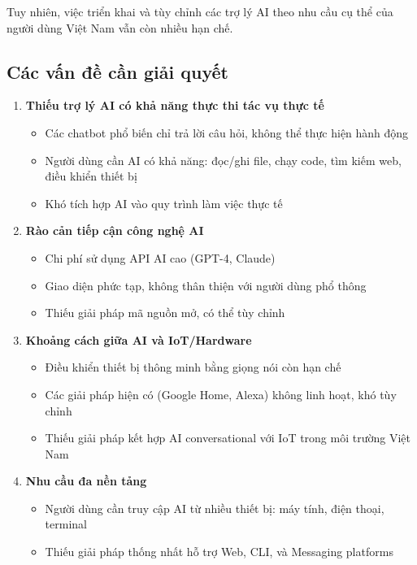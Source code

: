 \documentclass[12pt,a4paper]{article}
\begin{document}
Tuy nhiên, việc triển khai và tùy chỉnh các trợ lý AI theo nhu cầu cụ thể của người dùng Việt Nam vẫn còn nhiều hạn chế.

\subsection{Các vấn đề cần giải quyết}

\begin{enumerate}[label=\textbf{(\arabic*)}]
    \item \textbf{Thiếu trợ lý AI có khả năng thực thi tác vụ thực tế}
    \begin{itemize}
        \item Các chatbot phổ biến chỉ trả lời câu hỏi, không thể thực hiện hành động
        \item Người dùng cần AI có khả năng: đọc/ghi file, chạy code, tìm kiếm web, điều khiển thiết bị
        \item Khó tích hợp AI vào quy trình làm việc thực tế
    \end{itemize}
    
    \item \textbf{Rào cản tiếp cận công nghệ AI}
    \begin{itemize}
        \item Chi phí sử dụng API AI cao (GPT-4, Claude)
        \item Giao diện phức tạp, không thân thiện với người dùng phổ thông
        \item Thiếu giải pháp mã nguồn mở, có thể tùy chỉnh
    \end{itemize}
    
    \item \textbf{Khoảng cách giữa AI và IoT/Hardware}
    \begin{itemize}
        \item Điều khiển thiết bị thông minh bằng giọng nói còn hạn chế
        \item Các giải pháp hiện có (Google Home, Alexa) không linh hoạt, khó tùy chỉnh
        \item Thiếu giải pháp kết hợp AI conversational với IoT trong môi trường Việt Nam
    \end{itemize}
    
    \item \textbf{Nhu cầu đa nền tảng}
    \begin{itemize}
        \item Người dùng cần truy cập AI từ nhiều thiết bị: máy tính, điện thoại, terminal
        \item Thiếu giải pháp thống nhất hỗ trợ Web, CLI, và Messaging platforms
    \end{itemize}
\end{enumerate}
\end{document}
